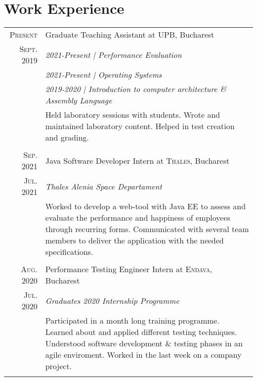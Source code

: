\documentclass[a4paper,10pt]{article}
\begin{document}
\section{Work Experience}
\begin{tabular}{r|p{11cm}}
	\textsc{Present} & Graduate Teaching Assistant at \textsc{UPB}, Bucharest \\
	\textsc{Sept. 2019} & \emph{2021-Present | Performance Evaluation} \\&
	\emph{2021-Present | Operating Systems} \\&
	\emph{2019-2020 | Introduction to computer architecture \& Assembly Language} \\&
	\footnotesize
	{
		Held laboratory sessions with students.
		Wrote and maintained laboratory content.
		Helped in test creation and grading.
	} \\
	\multicolumn{2}{c}{} \\

	\textsc{Sep. 2021} & Java Software Developer Intern at \textsc{Thales}, Bucharest \\
	\textsc{Jul. 2021} & \emph{Thales Alenia Space Departament}\\&
	\footnotesize
	{
		Worked to develop a web-tool with Java EE to assess and evaluate
		the performance and happiness of employees through recurring forms.
		Communicated with several team members to deliver the application
		with the needed specifications.
	} \\
	\multicolumn{2}{c}{} \\

	\textsc{Aug. 2020} & Performance Testing Engineer Intern at \textsc{Endava}, Bucharest \\
	\textsc{Jul. 2020}&\emph{Graduates 2020 Internship Programme}\\&
	\footnotesize
	{
		Participated in a month long training programme.
		Learned about and applied different testing techniques.
		Understood software development \& testing phases in an agile enviroment.
		Worked in the last week on a company project.
	} \\
	\multicolumn{2}{c}{} \\
\end{tabular}

\end{document}
